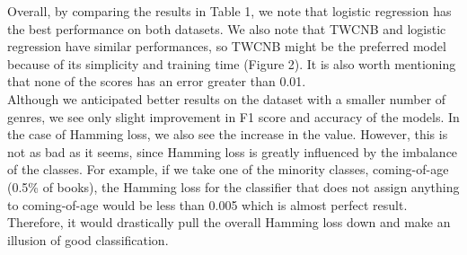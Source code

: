 \documentclass{article}
\begin{document}
Overall, by comparing the results in Table 1, we note that logistic regression has the best performance on both datasets. We also note that TWCNB and logistic regression have similar performances, so TWCNB might be the preferred model because of its simplicity and training time (Figure 2). It is also worth mentioning that none of the scores has an error greater than 0.01. \\ 
Although we anticipated better results on the dataset with a smaller number of genres, we see only slight improvement in F1 score and accuracy of the models. In the case of Hamming loss, we also see the increase in the value. However, this is not as bad as it seems, since Hamming loss is greatly influenced by the imbalance of the classes. For example, if we take one of the minority classes, coming-of-age (0.5\% of books), the Hamming loss for the classifier that does not assign anything to coming-of-age would be less than 0.005 which is almost perfect result. Therefore, it would drastically pull the overall Hamming loss down and make an illusion of good classification. \\
\end{document}
